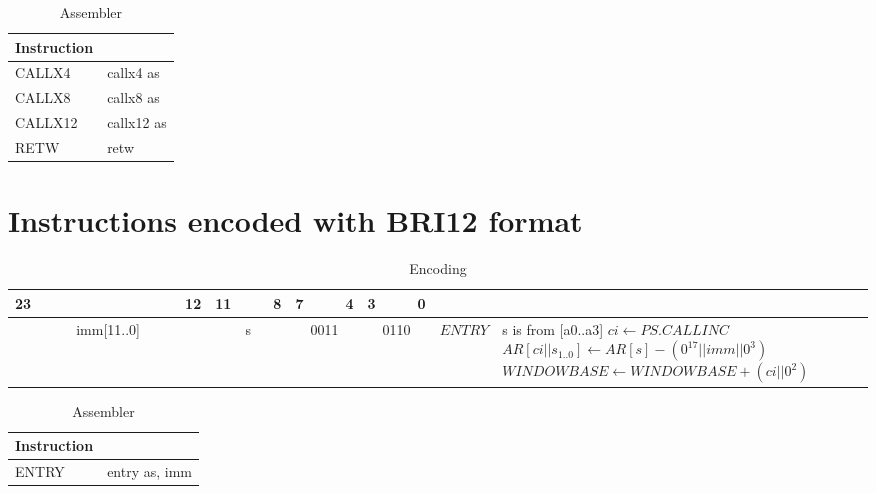\begin{longtable}{|p{5cm}|p{5cm}|}
	\caption{Assembler\label{long}}\\
	\hline
	Instruction & \\
	\hline
	CALLX4 & callx4 as\\ \hline
	CALLX8 & callx8 as\\ \hline
	CALLX12 & callx12 as\\ \hline
	RETW & retw\\ \hline
\end{longtable}

\newpage

\section*{Instructions encoded with BRI12 format}
\begin{longtable}{llllllllllllllllllllllll  p{1cm}  p{7cm} | }
	\caption{Encoding\label{long}}\\
	23 & & & & & & & & & & & 12 & 11 & & & 8 & 7 & & & 4 & 3 & & & 0 & &
	\multicolumn{1}{c}{}\\
	\hline
	\multicolumn{12}{|c|}{imm[11..0]} & \multicolumn{4}{c|}{s} & \multicolumn{4}{c|}{0011} & \multicolumn{4}{c|}{0110} & \multicolumn{1}{c|}{$ENTRY$} & s is from [a0..a3] \newline $ci \leftarrow PS.CALLINC$ \newline $AR[ci||s_{1..0}] \leftarrow AR[s] - (0^{17}||imm||0^3)$ \newline $WINDOWBASE \leftarrow WINDOWBASE + (ci||0^2)$ \\ \hline
\end{longtable}

\begin{longtable}{|p{5cm}|p{5cm}|}
	\caption{Assembler\label{long}}\\		
	\hline
	Instruction & \\
	\hline
	ENTRY & entry as, imm\\ \hline
\end{longtable}

